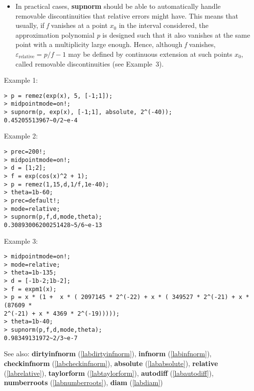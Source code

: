 \begin{itemize}
\item In practical cases, \textbf{supnorm} should be able to automatically handle
   removable discontinuities that relative errors might have. This means
   that usually, if \emph{f} vanishes at a point $x_0$ in the interval
   considered, the approximation polynomial \emph{p} is designed such that it
   also vanishes at the same point with a multiplicity large
   enough. Hence, although \emph{f} vanishes, $\varepsilon_{\textrm{relative}}=p/f-1$ may be 
   defined by continuous extension at such points $x_0$, called 
   removable discontinuities (see Example~$3$).
\end{itemize}
\noindent Example 1: 
\begin{center}\begin{minipage}{15cm}\begin{Verbatim}[frame=single,commandchars=\\\|\~]
> p = remez(exp(x), 5, [-1;1]);
> midpointmode=on!;
> supnorm(p, exp(x), [-1;1], absolute, 2^(-40));
0.45205513967~0/2~e-4
\end{Verbatim}
\end{minipage}\end{center}
\noindent Example 2: 
\begin{center}\begin{minipage}{15cm}\begin{Verbatim}[frame=single,commandchars=\\\|\~]
> prec=200!;
> midpointmode=on!;
> d = [1;2];
> f = exp(cos(x)^2 + 1);
> p = remez(1,15,d,1/f,1e-40);
> theta=1b-60;
> prec=default!;
> mode=relative;
> supnorm(p,f,d,mode,theta);
0.30893006200251428~5/6~e-13
\end{Verbatim}
\end{minipage}\end{center}
\noindent Example 3: 
\begin{center}\begin{minipage}{15cm}\begin{Verbatim}[frame=single,commandchars=\\\|\~]
> midpointmode=on!;
> mode=relative;
> theta=1b-135;
> d = [-1b-2;1b-2];
> f = expm1(x);
> p = x * (1 +  x * ( 2097145 * 2^(-22) + x * ( 349527 * 2^(-21) + x * (87609 * 
2^(-21) + x * 4369 * 2^(-19))))); 
> theta=1b-40;
> supnorm(p,f,d,mode,theta);
0.98349131972~2/3~e-7
\end{Verbatim}
\end{minipage}\end{center}
See also: \textbf{dirtyinfnorm} (\ref{labdirtyinfnorm}), \textbf{infnorm} (\ref{labinfnorm}), \textbf{checkinfnorm} (\ref{labcheckinfnorm}), \textbf{absolute} (\ref{lababsolute}), \textbf{relative} (\ref{labrelative}), \textbf{taylorform} (\ref{labtaylorform}), \textbf{autodiff} (\ref{labautodiff}), \textbf{numberroots} (\ref{labnumberroots}), \textbf{diam} (\ref{labdiam})

